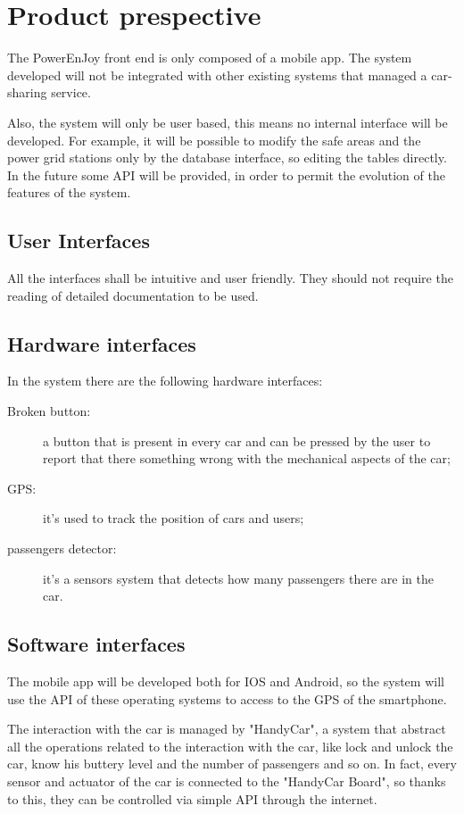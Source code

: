 \section{Product prespective}

The PowerEnJoy front end is only composed of a mobile app.
The system developed will not be integrated with other existing systems that managed a car-sharing service.

Also, the system will only be user based, this means no internal interface will be developed.
For example, it will be possible to modify the safe areas and the power grid stations only by the database interface, so editing the tables directly.
In the future some API will be provided, in order to permit the evolution of the features of the system.

\subsection{User Interfaces}
All the interfaces shall be intuitive and user friendly. They should not
require the reading of detailed documentation to be used.

\subsection{Hardware interfaces}
In the system there are the following hardware interfaces:
\begin{description}
	\item [Broken button:] a button that is present in every car and can be pressed by the user to report that there something wrong with the mechanical aspects of the car;
	\item [GPS:] it's used to track the position of cars and users;
	\item [passengers detector:] it's a sensors system that detects how many passengers there are in the car.
\end{description}

\subsection{Software interfaces}
The mobile app will be developed both for IOS and Android, so the system will use the API of these operating systems to access to the GPS of the smartphone.

The interaction with the car is managed by "HandyCar", a system that abstract all the operations related to the interaction with the car, like lock and unlock the car, know his buttery level and the number of passengers and so on.
In fact, every sensor and actuator of the car is connected to the "HandyCar Board", so thanks to this, they can be controlled via simple API through the internet.

